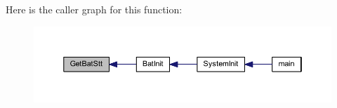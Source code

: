 \-Here is the caller graph for this function\-:\nopagebreak
\begin{figure}[H]
\begin{center}
\leavevmode
\includegraphics[width=350pt]{group___b_e_t_t_e_r_y_gad11b24ac1b2d2f4ad3c24201b9c7a244_icgraph}
\end{center}
\end{figure}



